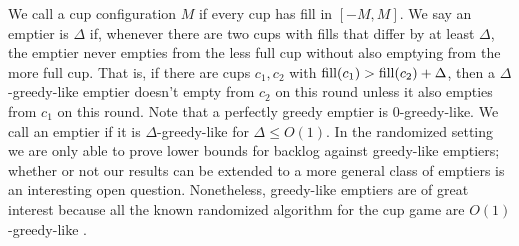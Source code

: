 
We call a cup configuration $M$ if every cup has fill
in $[-M, M]$. We say an emptier is $\Delta$
if, whenever there are two cups with fills that differ
by at least $\Delta$, the emptier never empties from the less full
cup without also emptying from the more full cup. That is, if
there are cups $c_1, c_2$ with $\operatorname{\text{fill}}(c_1) > \operatorname{\text{fill}}(c_2) + \Delta$,
then a $\Delta$-greedy-like emptier doesn't empty from $c_2$ on
this round unless it also empties from $c_1$ on this round.
Note that a perfectly greedy
emptier is $0$-greedy-like. We call an emptier  if it is
$\Delta$-greedy-like for $\Delta \le O(1)$.
In the randomized setting we are only able to prove lower bounds for backlog
against greedy-like emptiers; whether or not our results can be extended to a
more general class of emptiers is an interesting open question. 
Nonetheless, greedy-like emptiers are of great interest because
all the known randomized algorithm for the cup game are
$O(1)$-greedy-like \cite{wku20}\cite{mbe19}.



